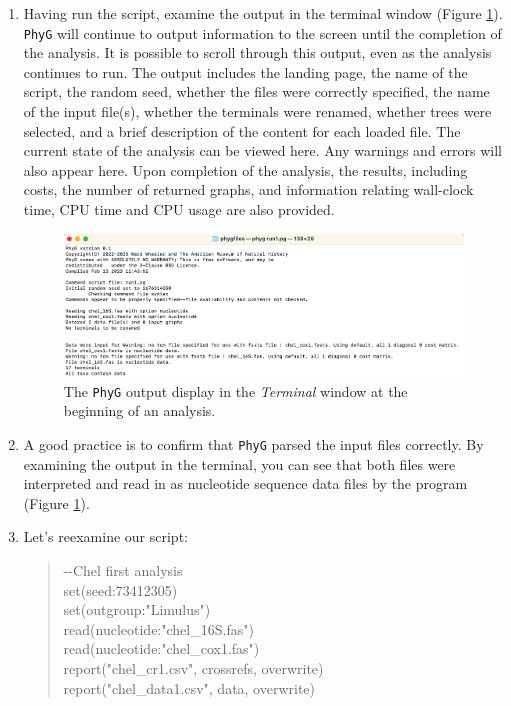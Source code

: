 \documentclass[11pt]{article}
\newcommand{\phyg}{\texttt{PhyG} }
\begin{document}
\begin{enumerate}

\item Having run the script, examine the output in the terminal window 
(Figure \ref{output1}). \phyg will continue to output information to the screen 
until the completion of the analysis. It is possible to scroll through this output, 
even as the analysis continues to run. The output includes the landing page, 
the name of the script, the random seed, whether the files were 
correctly specified, the name of the input file(s), whether the terminals were 
renamed, whether trees were selected, and a brief description of the content 
for each loaded file. The current state of the analysis can be viewed here. Any 
warnings and errors will also appear here. Upon completion of the analysis, the 
results, including costs, the number of returned graphs, and information relating 
wall-clock time, CPU time and CPU usage are also provided.

\begin{figure}
\centering
\includegraphics[width=\textwidth]{output1.png}
\caption{The \phyg output display in the \emph{Terminal} window at the beginning 
of an analysis.}
\label{output1}
\end{figure}

\item A good practice is to confirm that \phyg parsed the input files correctly. 
By examining the output in the terminal, you can see that both files were
interpreted and read in as nucleotide sequence data files by the program 
(Figure \ref{output1}).

\item Let's reexamine our script:

	\begin{quote}
	-\/-Chel first analysis\\
	set(seed:73412305)\\
	set(outgroup:"Limulus")\\
	read(nucleotide:"chel\_16S.fas")\\
	read(nucleotide:"chel\_cox1.fas")\\
	report("chel\_cr1.csv", crossrefs, overwrite)\\
	report("chel\_data1.csv", data, overwrite)\\
	\end{quote}
	

\end{enumerate}
\end{document}
